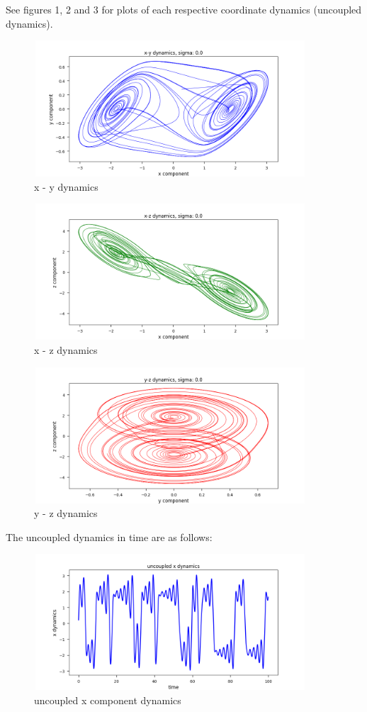 \documentclass{article}
\begin{document}
See figures 1, 2 and 3 for plots of each respective coordinate dynamics (uncoupled dynamics).

\begin{figure}[H]
\centering
\includegraphics[width = 4in, height = 2in]{dynamics_xy.png}
\caption{x - y dynamics}
\end{figure}

\begin{figure}[H]
\centering
\includegraphics[width = 4in, height = 2in]{dynamics_xz.png}
\caption{x - z dynamics}
\end{figure}

\begin{figure}[H]
\centering
\includegraphics[width = 4in, height = 2in]{dynamics_yz.png}
\caption{y - z dynamics}
\end{figure}

The uncoupled dynamics in time are as follows:

\begin{figure}[H]
\centering
\includegraphics[width = 4in, height = 2in]{x_dynamics_t.png}
\caption{uncoupled x component dynamics}
\end{figure}
\end{document}
